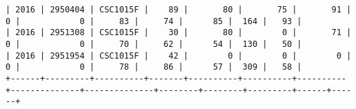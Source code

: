 \begin{sidewaysfigure}
\begin{mdframed}[rightline=false,leftline=false,topline=false]
\begin{BVerbatim}
| 2016 | 2950404 | CSC1015F |    89 |       80 |       75 |       91 |            0 |            0 |     83 |     74 |      85 |  164 |   93 |
| 2016 | 2951308 | CSC1015F |    30 |       80 |        0 |       71 |            0 |            0 |     70 |     62 |      54 |  130 |   50 |
| 2016 | 2951954 | CSC1015F |    42 |        0 |        0 |        0 |            0 |            0 |     78 |     86 |      57 |  309 |   58 |
+------+---------+----------+-------+----------+----------+----------+--------------+--------------+--------+--------+---------+------+------+
        \end{BVerbatim}
    \end{mdframed}
    \caption[Sample of 3-way CSV output]{\textbf{Figure \ref{fig-3-way-csv-output}: Sample of 3-way join CSV output}}
    \label{fig-3-way-csv-output}
\end{sidewaysfigure}
